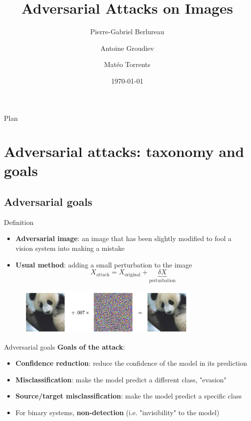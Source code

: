 \documentclass[aspectratio=169]{beamer}
\title{\textbf{Adversarial Attacks on Images}}
\author{Pierre-Gabriel Berlureau\and Antoine Groudiev\and Matéo Torrents}
\date{\today}
\theoremstyle{definition}
\begin{document}
\frame{\titlepage}

\begin{frame}{Plan}
   \tableofcontents
\end{frame}

\section{Adversarial attacks: taxonomy and goals}
\subsection{Adversarial goals}
\begin{frame}{Definition}
  \begin{itemize}
    \item \textbf{Adversarial image}: an image that has been slightly modified to fool a vision system into making a mistake
    \item \textbf{Usual method}: adding a small perturbation to the image
    \begin{equation*}
      X_{\text{attack}} = X_{\text{original}} + \underbrace{\delta X}_{\text{perturbation}}
    \end{equation*}
  \end{itemize}
  \begin{figure}
    \centering
    \includegraphics[width=0.8\textwidth]{panda.png}
  \end{figure}
\end{frame}
\begin{frame}{Adversarial goals}
\textbf{Goals of the attack}:
\begin{itemize}
  \item \textbf{Confidence reduction}: reduce the confidence of the model in its prediction
  \item \textbf{Misclassification}: make the model predict a different class, "evasion"
  \item \textbf{Source/target misclassification}: make the model predict a specific class
  \item For binary systems, \textbf{non-detection} (i.e. "invisibility" to the model)
\end{itemize}
\end{frame}
\end{document}
